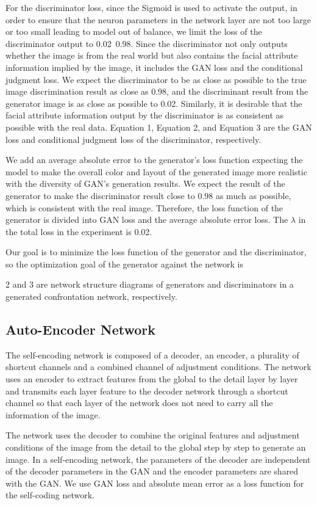 For the discriminator loss, since the Sigmoid is used to activate the output,
    in order to ensure that the neuron parameters in the network layer are not too large or too small leading to model out of balance,
    we limit the loss of the discriminator output to 0.02~0.98.
Since the discriminator not only outputs whether the image is from the real world but also contains the facial attribute information implied by the image,
    it includes the GAN loss and the conditional judgment loss.
We expect the discriminator to be as close as possible to the true image discrimination result as close as 0.98,
    and the discriminant result from the generator image is as close as possible to 0.02.
Similarly, it is desirable that the facial attribute information output by the discriminator is as consistent as possible with the real data.
Equation 1, Equation 2, and Equation 3 are the GAN loss and conditional judgment loss of the discriminator, respectively.

We add an average absolute error to the generator's loss function expecting the model to make the overall color and layout of the generated image more realistic with the diversity of GAN's generation results.
We expect the result of the generator to make the discriminator result close to 0.98 as much as possible, which is consistent with the real image.
Therefore, the loss function of the generator is divided into GAN loss and the average absolute error loss.
The $\lambda$ in the total loss in the experiment is 0.02.

Our goal is to minimize the loss function of the generator and the discriminator, so the optimization goal of the generator against the network is %

2 and 3 are network structure diagrams of generators and discriminators in a generated confrontation network, respectively.

\subsection{Auto-Encoder Network}
The self-encoding network is composed of a decoder, an encoder, a plurality of shortcut channels and a combined channel of adjustment conditions.
The network uses an encoder to extract features from the global to the detail layer by layer and transmits each layer feature to the decoder network through a shortcut channel so that each layer of the network does not need to carry all the information of the image.

The network uses the decoder to combine the original features and adjustment conditions of the image from the detail to the global step by step to generate an image.
In a self-encoding network, the parameters of the decoder are independent of the decoder parameters in the GAN and the encoder parameters are shared with the GAN.
We use GAN loss and absolute mean error as a loss function for the self-coding network.

